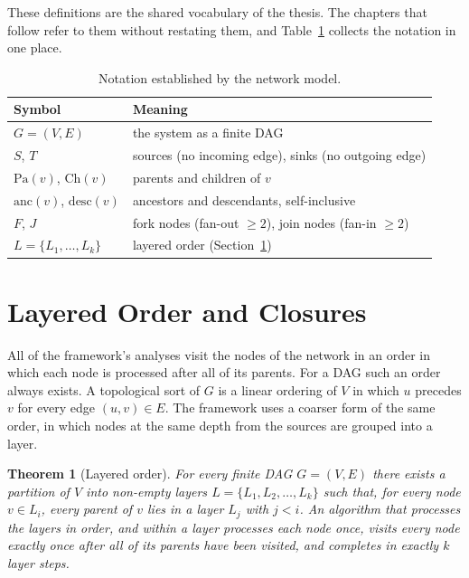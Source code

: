 \documentclass[12pt]{report}
\newtheorem{theorem}{Theorem}[chapter]
\begin{document}
These definitions are the shared vocabulary of the thesis. The chapters that follow refer to
them without restating them, and Table~\ref{tab:model-notation} collects the notation in one
place.

\begin{table}[htbp]
\centering
\caption{Notation established by the network model.}
\label{tab:model-notation}
\small
\renewcommand{\arraystretch}{1.2}
\begin{tabular}{ll}
\toprule
Symbol & Meaning \\
\midrule
$G=(V,E)$ & the system as a finite DAG \\
$S$, $T$ & sources (no incoming edge), sinks (no outgoing edge) \\
$\mathrm{Pa}(v)$, $\mathrm{Ch}(v)$ & parents and children of $v$ \\
$\mathrm{anc}(v)$, $\mathrm{desc}(v)$ & ancestors and descendants, self-inclusive \\
$F$, $J$ & fork nodes (fan-out $\ge 2$), join nodes (fan-in $\ge 2$) \\
$L = \{L_1, \dots, L_k\}$ & layered order (Section~\ref{sec:model-layers}) \\
\bottomrule
\end{tabular}
\end{table}

\section{Layered Order and Closures}
\label{sec:model-layers}

All of the framework's analyses visit the nodes of the network in an order in which each
node is processed after all of its parents. For a DAG such an order always exists. A topological sort of $G$ is a linear ordering of $V$ in which $u$ precedes $v$ for every edge
$(u,v) \in E$. The framework uses a coarser form of the same order, in which nodes at the same
depth from the sources are grouped into a layer.

\begin{theorem}[Layered order]
\label{thm:model-layers}
For every finite DAG $G=(V,E)$ there exists a partition of $V$ into non-empty layers
$L = \{L_1, L_2, \dots, L_k\}$ such that, for every node $v \in L_i$, every parent of $v$ lies
in a layer $L_j$ with $j < i$. An algorithm that processes the layers in order, and within a
layer processes each node once, visits every node exactly once after all of its parents have
been visited, and completes in exactly $k$ layer steps.
\end{theorem}
\end{document}
